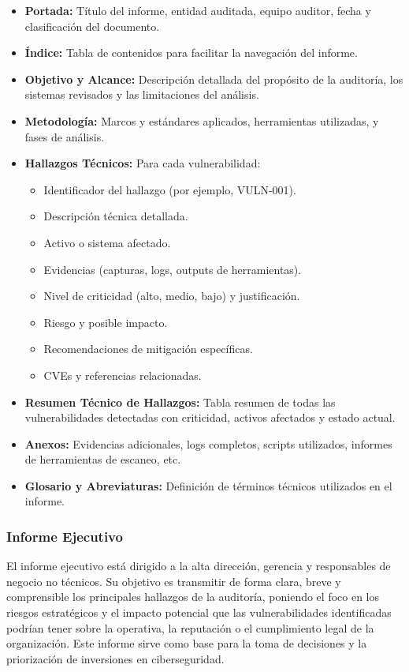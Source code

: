 \documentclass[a4paper, 11pt]{article}
\begin{document}
\begin{itemize}
  \item \textbf{Portada:} Título del informe, entidad auditada, equipo auditor, fecha y clasificación del documento.
  \item \textbf{Índice:} Tabla de contenidos para facilitar la navegación del informe.
  \item \textbf{Objetivo y Alcance:} Descripción detallada del propósito de la auditoría, los sistemas revisados y las limitaciones del análisis.
  \item \textbf{Metodología:} Marcos y estándares aplicados, herramientas utilizadas, y fases de análisis.
  \item \textbf{Hallazgos Técnicos:} Para cada vulnerabilidad:
  \begin{itemize}
    \item Identificador del hallazgo (por ejemplo, VULN-001).
    \item Descripción técnica detallada.
    \item Activo o sistema afectado.
    \item Evidencias (capturas, logs, outputs de herramientas).
    \item Nivel de criticidad (alto, medio, bajo) y justificación.
    \item Riesgo y posible impacto.
    \item Recomendaciones de mitigación específicas.
    \item CVEs y referencias relacionadas.
  \end{itemize}
  \item \textbf{Resumen Técnico de Hallazgos:} Tabla resumen de todas las vulnerabilidades detectadas con criticidad, activos afectados y estado actual.
  \item \textbf{Anexos:} Evidencias adicionales, logs completos, scripts utilizados, informes de herramientas de escaneo, etc.
  \item \textbf{Glosario y Abreviaturas:} Definición de términos técnicos utilizados en el informe.
\end{itemize}



\subsubsection{Informe Ejecutivo}

El informe ejecutivo está dirigido a la alta dirección, gerencia y responsables de negocio no técnicos. Su objetivo es transmitir de forma clara, breve y comprensible los principales hallazgos de la auditoría, poniendo el foco en los riesgos estratégicos y el impacto potencial que las vulnerabilidades identificadas podrían tener sobre la operativa, la reputación o el cumplimiento legal de la organización. Este informe sirve como base para la toma de decisiones y la priorización de inversiones en ciberseguridad.
\end{document}

